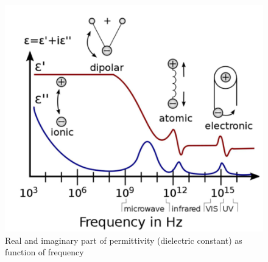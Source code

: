 \documentclass[%
 aip,
 amsmath,amssymb,
 reprint, floatfix%
]{revtex4-1}
\begin{document}
    \begin{figure}
        \centering
        \includegraphics[scale = 0.8]{Figures/modelplot.png}
        \caption{Real and imaginary part of permittivity (dielectric constant) as function of frequency}
        \label{fig:model-plot}
    \end{figure}
    
\end{document}

